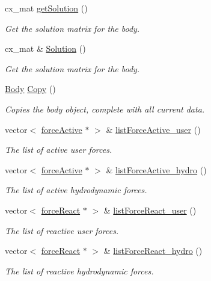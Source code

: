 \begin{DoxyCompactItemize}
cx\-\_\-mat \hyperlink{class_body_a5153b4cfad5bf12ae6f279a5e7190c31}{get\-Solution} ()
\begin{DoxyCompactList}\small\item\em Get the solution matrix for the body. \end{DoxyCompactList}\item 
cx\-\_\-mat \& \hyperlink{class_body_abca1fdefd8fd12c9548c5e0d157d00ac}{Solution} ()
\begin{DoxyCompactList}\small\item\em Get the solution matrix for the body. \end{DoxyCompactList}\item 
\hyperlink{class_body}{Body} \hyperlink{class_body_a370dc9a5702d93d9295a9618ebdef456}{Copy} ()
\begin{DoxyCompactList}\small\item\em Copies the body object, complete with all current data. \end{DoxyCompactList}\item 
vector$<$ \hyperlink{classforce_active}{force\-Active} $\ast$ $>$ \& \hyperlink{class_body_a09cc32078919b282e5077f18f3343b35}{list\-Force\-Active\-\_\-user} ()
\begin{DoxyCompactList}\small\item\em The list of active user forces. \end{DoxyCompactList}\item 
vector$<$ \hyperlink{classforce_active}{force\-Active} $\ast$ $>$ \& \hyperlink{class_body_a2e7a45fefe1c449e333891bdfea0b264}{list\-Force\-Active\-\_\-hydro} ()
\begin{DoxyCompactList}\small\item\em The list of active hydrodynamic forces. \end{DoxyCompactList}\item 
vector$<$ \hyperlink{classforce_react}{force\-React} $\ast$ $>$ \& \hyperlink{class_body_abf20f5bfe14f6c831db9718682d7857d}{list\-Force\-React\-\_\-user} ()
\begin{DoxyCompactList}\small\item\em The list of reactive user forces. \end{DoxyCompactList}\item 
vector$<$ \hyperlink{classforce_react}{force\-React} $\ast$ $>$ \& \hyperlink{class_body_a6d728e1c27df4498ffe3b270bc2bd4b6}{list\-Force\-React\-\_\-hydro} ()
\begin{DoxyCompactList}\small\item\em The list of reactive hydrodynamic forces. \end{DoxyCompactList}\item 

\end{DoxyCompactItemize}
